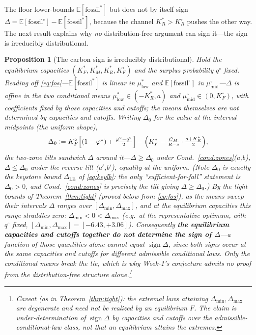 \documentclass[11pt,reqno]{amsart}
\theoremstyle{plain}
\newtheorem{proposition}{Proposition}
\theoremstyle{definition}
\theoremstyle{remark}
\newcommand{\KRs}{K_R^{*}}
\newcommand{\KFs}{K_F^{*}}
\newcommand{\KMs}{K_M^{*}}
\newcommand{\KRo}{K_R^{\circ}}
\newcommand{\KFo}{K_F^{\circ}}
\newcommand{\CM}{C_M}
\newcommand{\E}{\mathbb{E}}
\newcommand{\eqdef}{\vcentcolon=}
\begin{document}
The floor lower-bounds $\E[\text{fossil}^{*}]$ but does not by itself sign
$\Delta=\E[\text{fossil}^{\circ}]-\E[\text{fossil}^{*}]$, because the channel
$\KRs>\KRo$ pushes the other way. The next result explains why \emph{no}
distribution-free argument can sign it---the sign is irreducibly distributional.

\begin{proposition}[The carbon sign is irreducibly distributional]\label{prop:irreducible}
Hold the equilibrium capacities $(\KFs,\KMs,\KRs,\KFo)$ and the surplus probability
$q^{\circ}$ fixed. Reading off \eqref{eq:fos}---$\E[\text{fossil}^{*}]$ is linear in
$\mu^{*}_{\mathrm{low}}$ and $\E[\text{fossil}^{\circ}]$ in
$\mu^{\circ}_{\mathrm{mid}}$---$\Delta$ is \emph{affine} in the two conditional means
$\mu^{*}_{\mathrm{low}}\in(-\KRs,a)$ and $\mu^{\circ}_{\mathrm{mid}}\in(0,\KFo)$,
with coefficients fixed by those capacities and cutoffs; the means themselves are
\emph{not} determined by capacities and cutoffs. Writing $\Delta_0$ for the value at
the interval midpoints (the uniform shape),
\begin{equation}\label{eq:D0}
  \Delta_0\eqdef\KFo\Big[(1-\varphi^{\circ})+\tfrac{\varphi^{\circ}-q^{\circ}}{2}\Big]
  -\Big(\KFs-\tfrac{\CM}{R-c}\cdot\tfrac{a+\KRs}{2}\Big),
\end{equation}
the two-zone tilts sandwich $\Delta$ around it---$\Delta\ge\Delta_0$ under
Cond.~\ref{cond:zones}(a,b), $\Delta\le\Delta_0$ under the reverse tilt
(a$'$,b$'$), equality at the uniform. (Note $\Delta_0$ is exactly the keystone bound
$\Delta_{\mathrm{LB}}$ of \eqref{eq:keylb}: the only ``sufficient-for-fall''
statement is $\Delta_0>0$, and Cond.~\ref{cond:zones} is precisely the tilt giving
$\Delta\ge\Delta_0$.) By the tight bounds of Theorem~\ref{thm:tight} (proved below
from \eqref{eq:fos}), as the means sweep their
intervals $\Delta$ ranges over $[\Delta_{\min},\Delta_{\max}]$, and at the
equilibrium capacities this range \emph{straddles zero}: $\Delta_{\min}<0<\Delta_{\max}$
(e.g.\ at the representative optimum, with $q^{\circ}$ fixed,
$[\Delta_{\min},\Delta_{\max}]=[-6.43,+3.06]$).
Consequently \textbf{the equilibrium capacities and cutoffs together do not
determine the sign of $\Delta$}---a function of those quantities alone cannot equal
$\operatorname{sign}\Delta$, since both signs occur at the same capacities and
cutoffs for different admissible conditional laws. Only the conditional means break
the tie, which is why Week-1's conjecture admits no proof from the distribution-free
structure alone.\footnote{Caveat (as in Theorem~\ref{thm:tight}): the extremal laws
attaining $\Delta_{\min},\Delta_{\max}$ are degenerate and need not be realized by
an equilibrium $F$. The claim is under-determination of $\operatorname{sign}\Delta$
by capacities and cutoffs over the admissible-conditional-law class, not that an
equilibrium attains the extremes.}
\end{proposition}
\end{document}
